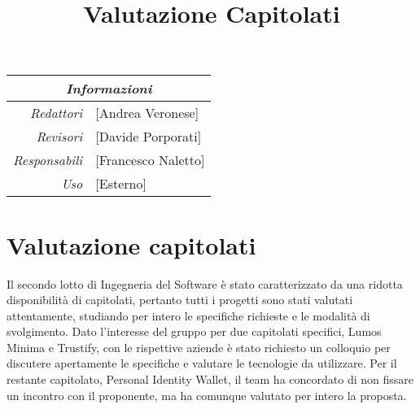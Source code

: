 \documentclass[12pt]{article}
\begin{document}
\graphicspath{ {../templates/img/} }


\title{Valutazione Capitolati}

\firstPage
\maketitle


\begin{center}
    \begin{tabular}{r | l}
		\multicolumn{2}{c}{\textit{Informazioni}}\\
		\hline
		
			\textit{Redattori} &
			[Andrea Veronese]\makecell{}\\
		
			\textit{Revisori} &
			[Davide Porporati]\makecell{}\\
			\textit{Responsabili} &
			[Francesco Naletto]\makecell{}\\
		      \textit{Uso} & 
                [Esterno]\makecell{}\\
\end{tabular}
\end{center}


\tableofcontents
\printindex 
\section{Valutazione capitolati}
Il secondo lotto di Ingegneria del Software è stato caratterizzato da una ridotta disponibilità di capitolati, pertanto tutti i progetti sono stati valutati attentamente, studiando per intero le specifiche richieste e le modalità di svolgimento.
Dato l'interesse del gruppo per due capitolati specifici, Lumos Minima e Trustify, con le rispettive aziende è stato richiesto un colloquio per discutere apertamente le specifiche e valutare le tecnologie da utilizzare.
Per il restante capitolato, Personal Identity Wallet, il team ha concordato di non fissare un incontro con il proponente, ma ha comunque valutato per intero la proposta.
\end{document}
